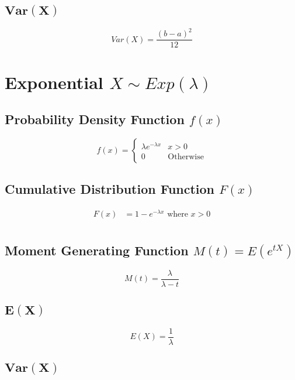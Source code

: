 \documentclass[12pt]{article}
\begin{document}
\subsection{$\bm{Var(X)}$}

\begin{equation*}
  Var(X)= \frac{(b-a)^{2}}{12}
\end{equation*}

\newpage
\section{Exponential $X \sim Exp(\lambda)$}
\subsection{Probability Density Function $f(x)$}

\begin{equation*}
  f(x) =
  \begin{cases}
     \lambda e^{-\lambda x} & x>0 \\
     0 & \text{Otherwise}
  \end{cases}
\end{equation*}

\subsection{Cumulative Distribution Function $F(x)$}
\begin{align*}
  F(x) &= 1-e^{-\lambda x} \text{ where $x>0$}\\
\end{align*}

\subsection{Moment Generating Function $M(t)=E(e^{tX})$}

\begin{equation*}
    M(t)=\frac{\lambda}{\lambda -t}
\end{equation*}

\subsection{$\bm{E(X)}$}

\begin{equation*}
  E(X) = \frac{1}{\lambda}
\end{equation*}

\subsection{$\bm{Var(X)}$}
\end{document}
